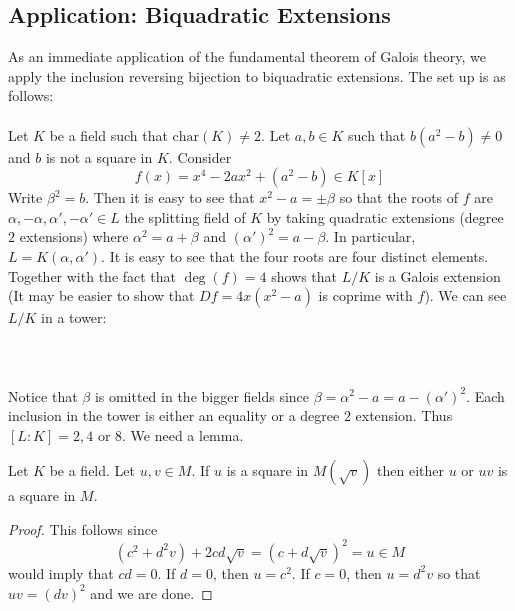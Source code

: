 \documentclass[a4paper]{article}
\begin{document}
\subsection{Application: Biquadratic Extensions}
As an immediate application of the fundamental theorem of Galois theory, we apply the inclusion reversing bijection to biquadratic extensions. The set up is as follows: \\~\\

Let $K$ be a field such that $\text{char}(K)\neq 2$. Let $a,b\in K$ such that $b(a^2-b)\neq 0$ and $b$ is not a square in $K$. Consider $$f(x)=x^4-2ax^2+(a^2-b)\in K[x]$$ Write $\beta^2=b$. Then it is easy to see that $x^2-a=\pm\beta$ so that the roots of $f$ are $\alpha,-\alpha,\alpha',-\alpha'\in L$ the splitting field of $K$ by taking quadratic extensions (degree $2$ extensions) where $\alpha^2=a+\beta$ and $(\alpha')^2=a-\beta$. In particular, $L=K(\alpha,\alpha')$. It is easy to see that the four roots are four distinct elements. Together with the fact that $\deg(f)=4$ shows that $L/K$ is a Galois extension (It may be easier to show that $Df=4x(x^2-a)$ is coprime with $f$). We can see $L/K$ in a tower: \\~\\
\\~\\

Notice that $\beta$ is omitted in the bigger fields since $\beta=\alpha^2-a=a-(\alpha')^2$. Each inclusion in the tower is either an equality or a degree $2$ extension. Thus $[L:K]=2,4$ or $8$. We need a lemma. 

\begin{lmm}{}{} Let $K$ be a field. Let $u,v\in M$. If $u$ is a square in $M(\sqrt{v})$ then either $u$ or $uv$ is a square in $M$. \tcbline
\begin{proof}
This follows since $$(c^2+d^2v)+2cd\sqrt{v}=(c+d\sqrt{v})^2=u\in M$$ would imply that $cd=0$. If $d=0$, then $u=c^2$. If $c=0$, then $u=d^2v$ so that $uv=(dv)^2$ and we are done. 
\end{proof}
\end{lmm}
\end{document}
